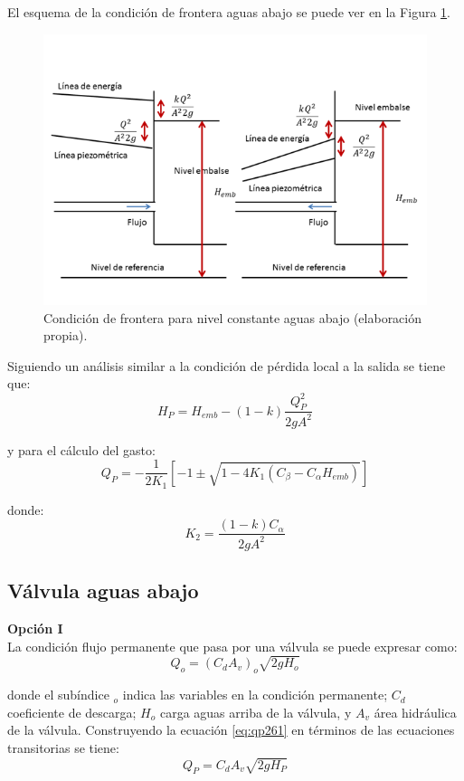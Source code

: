 \documentclass[letterpaper]{report}
\begin{document}
El esquema de la condición de frontera aguas abajo se puede ver en la Figura \ref{fig:fig27}.
\begin{figure}[H]
	\centering
	\includegraphics[width=0.9\linewidth]{figuras/fig27}
	\caption{Condición de frontera para nivel constante aguas abajo (elaboración propia).}
	\label{fig:fig27}
\end{figure}

Siguiendo un análisis similar a la condición de pérdida local a la salida se tiene que:
\begin{equation}
	H_P=H_{emb}-(1-k)\dfrac{Q_P^2}{2gA^2}
\end{equation}

y para el cálculo del gasto:
\begin{equation}
	Q_P=-\dfrac{1}{{2K}_1}\left[-1\pm\sqrt{1-{4K}_1(C_\beta-C_\alpha H_{emb})}\right]
\end{equation}

donde:
\begin{equation}
	K_2=\dfrac{(1-k)C_\alpha}{2gA^2}
\end{equation}

\subsection{Válvula aguas abajo}
\textbf{Opción I}\\
La condición flujo permanente que pasa por una válvula se puede expresar como:
\begin{equation}
	Q_o=(C_dA_v)_o\sqrt{2gH_o}
\label{eq:qp261}
\end{equation}

donde el subíndice $_o$ indica las variables en la condición permanente; $C_d$ coeficiente de descarga; $H_o$ carga aguas arriba de la válvula, y $A_v$ área hidráulica de la válvula. Construyendo la ecuación \ref{eq:qp261} en términos de las ecuaciones transitorias se tiene:
\begin{equation}
	Q_P=C_dA_v\sqrt{2gH_P}
\label{eq:qp27}
\end{equation}
\end{document}
